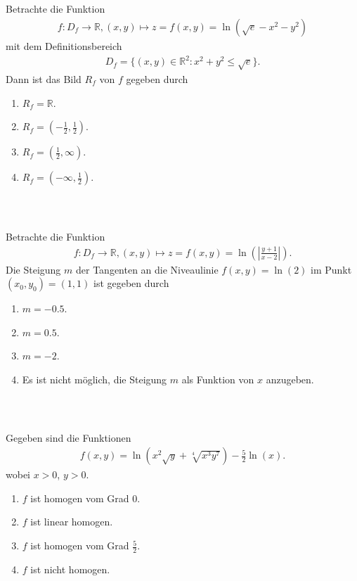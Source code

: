 \newpage
\subsection*{}
Betrachte die Funktion
\begin{align*}
f : D_f \to \mathbb{R}, 
(x,y) \mapsto z = f(x,y) = \ln(\sqrt{e} -x^2 -y^2)
\end{align*}
mit dem Definitionsbereich
\begin{align*}
D_f
= \{
(x,y) \in \mathbb{R}^2 : x^2 + y^2 \leq \sqrt{e}
\}.
\end{align*}
Dann ist das Bild $ R_f $ von $ f $ gegeben durch
\renewcommand{\labelenumi}{(\alph{enumi})}
\begin{enumerate}
\item 
$R_f = \mathbb{R} $.
\item
$R_f = \left( -\frac{1}{2}, \frac{1}{2} \right) $.
\item
$R_f = \left(  \frac{1}{2}, \infty \right) $.
\item
$R_f = \left( -\infty, \frac{1}{2} \right) $.
\end{enumerate}
\ \\
\subsection*{}
Betrachte die Funktion
\begin{align*}
f :D_f \to \mathbb{R},
(x,y) \mapsto
z = f(x,y) = \ln \left( \left| \frac{y+1}{x-2} \right|\right).
\end{align*}
Die Steigung $ m $ der Tangenten an die Niveaulinie $ f(x,y) = \ln(2) $ im Punkt $ (x_0,y_0) = (1,1) $ ist gegeben durch
\renewcommand{\labelenumi}{(\alph{enumi})}
\begin{enumerate}
\item 
$ m = -0.5 $.
\item
$ m = 0.5 $.
\item
$ m = -2 $.
\item
Es ist nicht möglich, die Steigung $ m $ als Funktion von $ x $ anzugeben.
\end{enumerate}
\ \\
\subsection*{}
Gegeben sind die Funktionen
\begin{align*}
f(x,y) =  \ln
\left( x^2 \sqrt{y} + \sqrt[4]{x^3 y^7}\right) - \frac{5}{2} \ln(x).
\end{align*}
wobei $ x> 0 $, $ y >0  $.
\renewcommand{\labelenumi}{(\alph{enumi})}
\begin{enumerate}
\item
$ f $ ist homogen vom Grad $ 0 $.

\item 
$ f $ ist linear homogen.
\item
$ f $ ist homogen vom Grad $ \frac{5}{2} $.
\item
$ f $ ist nicht homogen.
\end{enumerate}
\ \\
